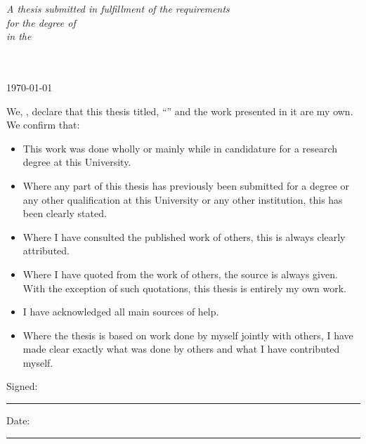 \documentclass[
    11pt,
    english, %
    singlespacing, %
    headsepline, %
    oneside, %
]{MastersDoctoralThesis} %
\begin{document}
\begin{titlepage}
\begin{center}
            \vfill

            \large \textit{A thesis submitted in fulfillment of the requirements\\ for the degree of \degreename}\\[0.3cm] %
            \textit{in the}\\[0.4cm]
            \groupname\\\deptname\\[2cm] %

            \vfill

            {\large \today}\\[4cm] %

            \vfill
        \end{center}
    \end{titlepage}


    \begin{declaration}
        \addchaptertocentry{\authorshipname} %
        \noindent We, \authorname, declare that this thesis titled, \enquote{\ttitle} and the work presented in it are my own.
        We confirm that:

        \begin{itemize}
            \item This work was done wholly or mainly while in candidature for a research degree at this University.
            \item Where any part of this thesis has previously been submitted for a degree or any other qualification at this University or any other institution, this has been clearly stated.
            \item Where I have consulted the published work of others, this is always clearly attributed.
            \item Where I have quoted from the work of others, the source is always given.
                    With the exception of such quotations, this thesis is entirely my own work.
            \item I have acknowledged all main sources of help.
            \item Where the thesis is based on work done by myself jointly with others, I have made clear exactly what was done by others and what I have contributed myself.\\
        \end{itemize}

        \noindent Signed:\\
        \rule[0.5em]{25em}{0.5pt} %

        \noindent Date:\\
        \rule[0.5em]{25em}{0.5pt} %
    \end{declaration}
\end{document}
